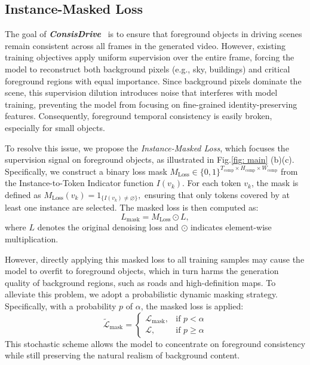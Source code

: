 \documentclass{article} %
\def\titleDef{\textbf{\textit{ConsisDrive}}}
\begin{document}
\subsection{Instance-Masked Loss} 
\label{section:loss}
The goal of \titleDef~ is to ensure that foreground objects in driving scenes remain consistent across all frames in the generated video. 
However, existing training objectives apply uniform supervision over the entire frame, forcing the model to reconstruct both background pixels (e.g., sky, buildings) and critical foreground regions with equal importance. 
Since background pixels dominate the scene, this supervision dilution 
introduces noise that interferes with model training, 
preventing the model from focusing on fine-grained identity-preserving features.
Consequently, foreground temporal consistency is easily broken, especially for small objects.

% 
To resolve this issue, we propose the \emph{Instance-Masked Loss}, which focuses the supervision signal on foreground objects, as illustrated in Fig.\ref{fig: main} (b)(c). 
Specifically, we construct a binary loss mask $M_\text{Loss} \in \{0,1\}^{T_\text{comp} \times H_\text{comp} \times W_\text{comp}}$ from the Instance-to-Token Indicator function $I(v_k)$.
For each token $v_k$, the mask is defined as $M_\text{Loss}(v_k) = 1_{\{I(v_k) \neq \varnothing\}},$
ensuring that only tokens covered by at least one instance are selected.  
The masked loss is then computed as: $$L_\text{mask} = M_\text{Loss} \odot L,$$
where $L$ denotes the original denoising loss and $\odot$ indicates element-wise multiplication.  

However, directly applying this masked loss to all training samples may cause the model to overfit to foreground objects, 
which in turn harms the generation quality of background regions, such as roads and high-definition maps. 
To alleviate this problem, we adopt a probabilistic dynamic masking strategy. 
Specifically, with a probability $p$ of $\alpha$, the masked loss is applied:
\begin{equation}
\label{eq: dynamic_mask_loss}
\mathcal{\tilde{L}}_{\text{mask}} = 
\begin{cases}
\mathcal{L}_{\text{mask}}, & \text{if } p < \alpha \\
\mathcal{L}, & \text{if } p \geq \alpha
\end{cases}
\end{equation}
This stochastic scheme allows the model to concentrate on foreground consistency while still preserving the natural realism of background content.
\end{document}
